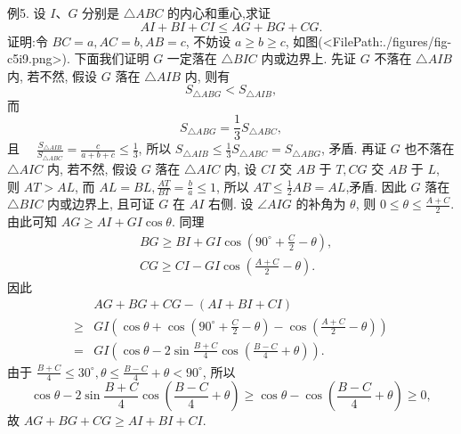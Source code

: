 例5. 设 $I 、 G$ 分别是 $\triangle A B C$ 的内心和重心,求证
$$
A I+B I+C I \leqslant A G+B G+C G .
$$
证明:令 $B C=a, A C=b, A B=c$, 不妨设 $a \geqslant b \geqslant c$, 如图(<FilePath:./figures/fig-c5i9.png>). 下面我们证明 $G$ 一定落在 $\triangle B I C$ 内或边界上.
先证 $G$ 不落在 $\triangle A I B$ 内, 若不然, 假设 $G$ 落在 $\triangle A I B$ 内, 则有
$$
S_{\triangle A B G}<S_{\triangle A I B},
$$
而
$$
S_{\triangle A B G}=\frac{1}{3} S_{\triangle A B C},
$$
且 $\quad \frac{S_{\triangle A I B}}{S_{\triangle A B C}}=\frac{c}{a+b+c} \leqslant \frac{1}{3}$,
所以 $S_{\triangle A I B} \leqslant \frac{1}{3} S_{\triangle A B C}=S_{\triangle A B G}$, 矛盾.
再证 $G$ 也不落在 $\triangle A I C$ 内, 若不然, 假设 $G$ 落在 $\triangle A I C$ 内, 设 $C I$ 交 $A B$ 于 $T, C G$ 交 $A B$ 于 $L$, 则 $A T>A L$, 而 $A L=B L, \frac{A T}{B T}=\frac{b}{a} \leqslant 1$, 所以 $A T \leqslant \frac{1}{2} A B=A L$,矛盾.
因此 $G$ 落在 $\triangle B I C$ 内或边界上, 且可证 $G$ 在 $A I$ 右侧.
设 $\angle A I G$ 的补角为 $\theta$, 则 $0 \leqslant \theta \leqslant \frac{A+C}{2}$. 由此可知 $A G \geqslant A I+G I \cos \theta$.
同理
$$
\begin{aligned}
& B G \geqslant B I+G I \cos \left(90^{\circ}+\frac{C}{2}-\theta\right), \\
& C G \geqslant C I-G I \cos \left(\frac{A+C}{2}-\theta\right) .
\end{aligned}
$$
因此
$$
\begin{aligned}
& A G+B G+C G-(A I+B I+C I) \\
\geqslant & G I\left(\cos \theta+\cos \left(90^{\circ}+\frac{C}{2}-\theta\right)-\cos \left(\frac{A+C}{2}-\theta\right)\right) \\
= & G I\left(\cos \theta-2 \sin \frac{B+C}{4} \cos \left(\frac{B-C}{4}+\theta\right)\right) .
\end{aligned}
$$
由于 $\frac{B+C}{4} \leqslant 30^{\circ}, \theta \leqslant \frac{B-C}{4}+\theta<90^{\circ}$, 所以
$$
\cos \theta-2 \sin \frac{B+C}{4} \cos \left(\frac{B-C}{4}+\theta\right) \geqslant \cos \theta-\cos \left(\frac{B-C}{4}+\theta\right) \geqslant 0,
$$
故 $A G+B G+C G \geqslant A I+B I+C I$.



